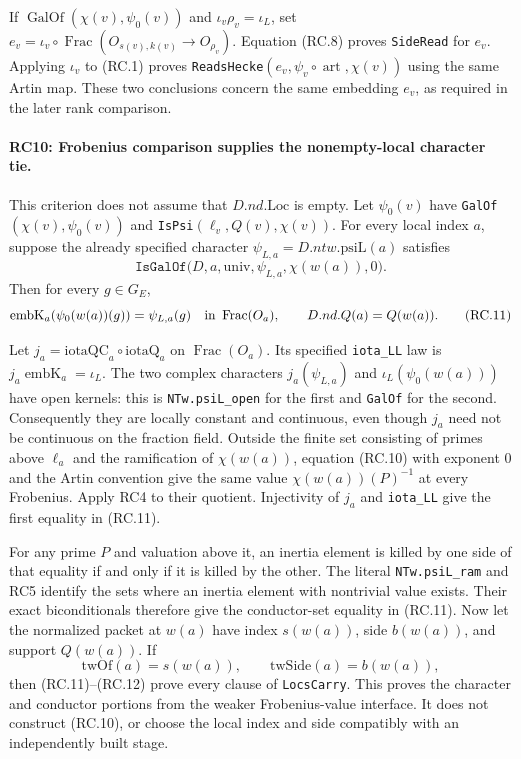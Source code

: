 If $\operatorname{GalOf}(\chi(v),\psi_0(v))$ and
$\iota_v\rho_v=\iota_L$, set
$e_v=\iota_v\circ\operatorname{Frac}(O_{s(v),k(v)}\to O_{\rho_v})$.
Equation (RC.8) proves \texttt{SideRead} for $e_v$.
Applying $\iota_v$ to (RC.1) proves
\texttt{ReadsHecke}$(e_v,\psi_v\circ\operatorname{art},\chi(v))$
using the same Artin map. These two conclusions concern the same
embedding $e_v$, as required in the later rank comparison.

\paragraph{RC10: Frobenius comparison supplies the nonempty-local character tie.}
This criterion does not assume that $D.nd.\mathrm{Loc}$ is empty.
Let $\psi_0(v)$ have \texttt{GalOf}$(\chi(v),\psi_0(v))$ and
\texttt{IsPsi}$(\ell_v,Q(v),\chi(v))$.
For every local index $a$, suppose the already specified character
$\psi_{L,a}=D.ntw.\mathrm{psiL}(a)$ satisfies
\[
 \texttt{IsGalOf}\bigl(D,a,\mathrm{univ},
               \psi_{L,a},\chi(w(a)),0\bigr).            \tag{RC.10}
\]
Then for every $g\in G_E$,
\[
 \operatorname{embK}_a(\psi_0(w(a))(g))
       =\psi_{L,a}(g)\quad\hbox{in }\operatorname{Frac}(O_a),
 \qquad D.nd.Q(a)=Q(w(a)).                              \tag{RC.11}
\]

Let $j_a=\mathrm{iotaQC}_a\circ\mathrm{iotaQ}_a$ on
$\operatorname{Frac}(O_a)$. Its specified \texttt{iota\_LL} law is
$j_a\operatorname{embK}_a=\iota_L$.
The two complex characters
$j_a(\psi_{L,a})$ and $\iota_L(\psi_0(w(a)))$ have open kernels:
this is \texttt{NTw.psiL\_open} for the first and \texttt{GalOf} for
the second. Consequently they are locally constant and continuous,
even though $j_a$ need not be continuous on the fraction field.
Outside the finite set consisting of primes above $\ell_a$ and the
ramification of $\chi(w(a))$, equation (RC.10) with exponent $0$
and the Artin convention give the same value
$\chi(w(a))(P)^{-1}$ at every Frobenius. Apply RC4 to their quotient.
Injectivity of $j_a$ and \texttt{iota\_LL} give the first equality
in (RC.11).

For any prime $P$ and valuation above it, an inertia element is killed
by one side of that equality if and only if it is killed by the other.
The literal \texttt{NTw.psiL\_ram} and RC5 identify the sets where an
inertia element with nontrivial value exists. Their exact
biconditionals therefore give the conductor-set equality in (RC.11).
Now let the normalized packet at $w(a)$ have index $s(w(a))$, side
$b(w(a))$, and support $Q(w(a))$. If
\[
        \mathrm{twOf}(a)=s(w(a)),\qquad
        \mathrm{twSide}(a)=b(w(a)),                       \tag{RC.12}
\]
then (RC.11)--(RC.12) prove every clause of \texttt{LocsCarry}.
This proves the character and conductor portions from the weaker
Frobenius-value interface. It does not construct (RC.10), or choose
the local index and side compatibly with an independently built stage.


